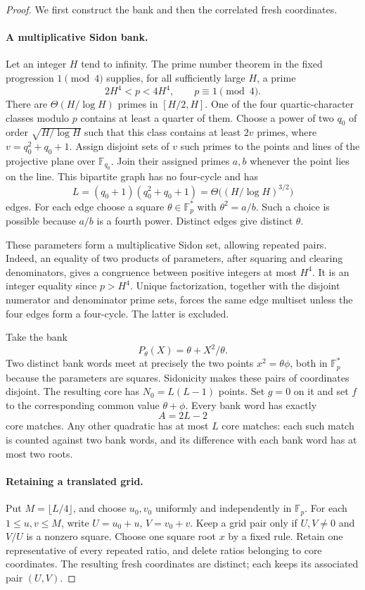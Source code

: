 \begin{proof}
We first construct the bank and then the correlated fresh coordinates.

\paragraph{A multiplicative Sidon bank.}
Let an integer $H$ tend to infinity.  The prime number theorem in the
fixed progression $1\pmod4$ supplies, for all sufficiently large $H$,
a prime
\[
 2H^4<p<4H^4,\qquad p\equiv1\pmod4.
\]
There are $\Theta(H/\log H)$ primes in $[H/2,H]$.
One of the four quartic-character classes modulo $p$ contains at
least a quarter of them.  Choose a power of two $q_0$ of order
$\sqrt{H/\log H}$ such that this class contains at least
$2v$ primes, where $v=q_0^2+q_0+1$.  Assign disjoint sets of $v$
such primes to the points and lines of the projective plane over
$\mathbb F_{q_0}$.  Join their assigned primes $a,b$ whenever the
point lies on the line.  This bipartite graph has no four-cycle and
has
\[
 L=(q_0+1)(q_0^2+q_0+1)
   =\Theta\bigl((H/\log H)^{3/2}\bigr)
\]
edges.  For each edge choose a square $\theta\in\mathbb F_p^*$ with
$\theta^2=a/b$.  Such a choice is possible because $a/b$ is a
fourth power.  Distinct edges give distinct $\theta$.

These parameters form a multiplicative Sidon set, allowing repeated
pairs.  Indeed, an equality of two products of parameters, after
squaring and clearing denominators, gives a congruence between
positive integers at most $H^4$.  It is an integer equality since
$p>H^4$.  Unique factorization, together with the disjoint numerator
and denominator prime sets, forces the same edge multiset unless the
four edges form a four-cycle.  The latter is excluded.

Take the bank
\[
 P_\theta(X)=\theta+X^2/\theta.
\]
Two distinct bank words meet at precisely the two points
$x^2=\theta\phi$, both in $\mathbb F_p^*$ because the parameters
are squares.  Sidonicity makes these pairs of coordinates disjoint.
The resulting core has $N_0=L(L-1)$ points.  Set $g=0$ on it and
set $f$ to the corresponding common value $\theta+\phi$.
Every bank word has exactly
\[
 A=2L-2
\]
core matches.  Any other quadratic has at most $L$ core matches:
each such match is counted against two bank words, and its difference
with each bank word has at most two roots.

\paragraph{Retaining a translated grid.}
Put $M=\lfloor L/4\rfloor$, and choose $u_0,v_0$ uniformly and
independently in $\mathbb F_p$.  For each $1\le u,v\le M$, write
$U=u_0+u$, $V=v_0+v$.  Keep a grid pair only if $U,V\ne0$ and
$V/U$ is a nonzero square.  Choose one square root $x$ by a fixed
rule.  Retain one representative of every repeated ratio, and delete
ratios belonging to core coordinates.  The resulting fresh coordinates
are distinct; each keeps its associated pair $(U,V)$.


\end{proof}
